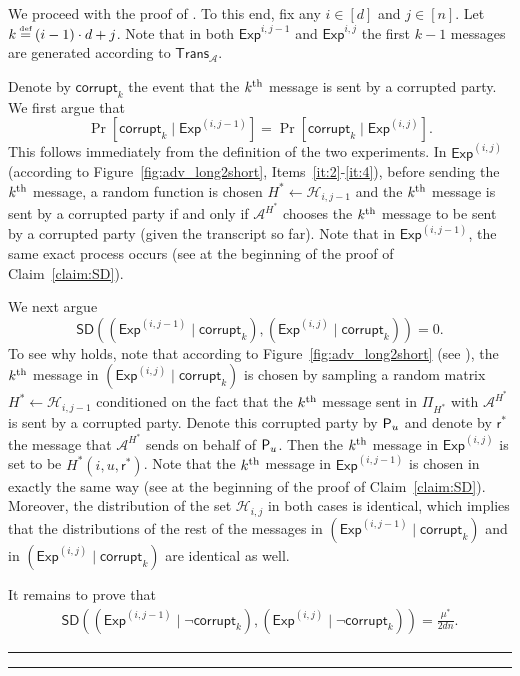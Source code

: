\documentclass[11pt]{article}
\theoremstyle{plain}
\theoremstyle{definition}
\numberwithin{equation}{section}
\newcommand{\qedsymb}{\hfill{\rule{2mm}{2mm}}}
\renewenvironment{proof}{\begin{trivlist} \item[\hspace{\labelsep}{\bf
\noindent Proof.\/}] }{\qedsymb\end{trivlist}}
\numberwithin{equation}{section} \newcommand{\aka} {also known as\ }
\newcommand{\eqdef} {\mathrel{\stackrel{\makebox[0pt]{\mbox{\normalfont\tiny
def}}}{=}}}
\newcommand{\Hc}{\mathcal H}
\newcommand{\1}{\mathbf{1}}
\newcommand{\Adv}{\mathcal A}
\newcommand{\ith}[1]{{#1}\textsuperscript{th}}
\newcommand{\SD}{\mathsf{SD}}
\def\({\left(}
\def\){\right)}
\newcommand{\corr}{\textsf{corrupt}_k}
\newcommand{\sh}{{\mathsf{r}}}
\newcommand{\trans}{{\mathsf{Trans}}}
\newcommand{\Exp}{\mathsf{Exp}}
\theoremstyle{remark}
\def\({\left(}
\def\){\right)}
\begin{document}
\begin{proof}
\begin{proof}
  We proceed with the proof of . To this end, fix any $i\in[d]$
  and $j\in[n]$.  Let $k\eqdef (i-1)\cdot d+j$.  Note that in both
  $\Exp^{i,j-1}$ and $\Exp^{i,j}$ the first $k-1$ messages are generated according
  to $\trans_{\Adv}$.

  Denote by $\corr$ the event that the $\ith{k}$ message is sent by a
  corrupted party.  We first argue that
  $$
  \Pr\left[\corr\mid\Exp^{(i,j-1)}\right]=  \Pr\left[\corr\mid\Exp^{(i,j)}\right].
  $$
  This follows immediately from the definition of the two experiments.  In $\Exp^{(i,j)}$ (according to Figure~\ref{fig:adv_long2short}, Items~\ref{it:2}-\ref{it:4}), before sending the $\ith{k}$ message, a random function is chosen $H^*\leftarrow\Hc_{i,j-1}$ and the $\ith{k}$ message is sent by a corrupted party if and only if $\Adv^{H^*}$ chooses the $\ith{k}$ message to be sent by a corrupted party (given the transcript so far).
  Note that in $\Exp^{(i,j-1)}$, the same exact process occurs (see
   at the beginning of the proof of
  Claim~\ref{claim:SD}).

  We next argue
  \begin{equation}\label{eqn:Exp-corr}
    \SD\(\(\Exp^{(i,j-1)}\mid \corr\), \(\Exp^{(i,j)} \mid \corr\)\) = 0.
  \end{equation}
  To see why  holds, note that according to
  Figure~\ref{fig:adv_long2short} (see ), the
  $\ith{k}$ message in $\left(\Exp^{(i,j)}\mid \corr\right)$ is chosen by
  sampling a random matrix $H^*\leftarrow\Hc_{i,j-1}$ conditioned on the fact
  that the $\ith{k}$ message sent in $\Pi_{H^*}$ with $\Adv^{H^*}$ is sent
  by a corrupted party. Denote this corrupted party by $\mathsf{P}_{{u}}$ and denote by
  $\sh^*$ the message that $\Adv^{H^*}$ sends on behalf of $\mathsf{P}_{{u}}$.  Then
  the $\ith{k}$ message in $\Exp^{(i,j)}$ is set to be $H^*(i,u,\sh^*)$.
  Note that the $\ith{k}$ message in $\Exp^{(i,j-1)}$ is chosen in exactly the same way (see
   at the beginning of the proof of
  Claim~\ref{claim:SD}).  Moreover, the distribution of the set $\Hc_{i,j}$ in both cases is identical, which implies that the distributions of the rest of the messages in $\(\Exp^{(i,j-1)}\mid
  \corr\)$ and in $\(\Exp^{(i,j)}\mid \corr\)$ are identical as well.

  It remains to prove that
  \begin{align}\label{eqn:hybrid-corr}
    \SD\left(\left(\Exp^{(i,j-1)}\mid \neg{\corr}\right),
      \left(\Exp^{(i,j)}\mid\neg{\corr}\right)\right) = \frac{\mu^*}{2dn}.
  \end{align}


\end{proof}
\end{proof}
\end{document}

